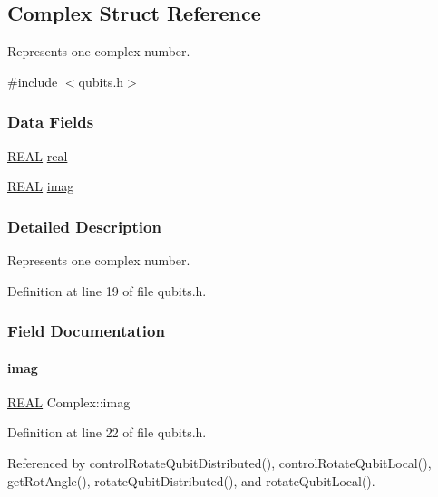 \hypertarget{structComplex}{}\subsection{Complex Struct Reference}
\label{structComplex}


Represents one complex number.  




{\ttfamily \#include $<$qubits.\+h$>$}

\subsubsection*{Data Fields}
\begin{DoxyCompactItemize}
\item 
\hyperlink{precision_8h_a4b654506f18b8bfd61ad2a29a7e38c25}{R\+E\+AL} \hyperlink{structComplex_a479ad939835457595fcca3ca55c06283}{real}
\item 
\hyperlink{precision_8h_a4b654506f18b8bfd61ad2a29a7e38c25}{R\+E\+AL} \hyperlink{structComplex_a1151948284b21c0052f203f23ab931d9}{imag}
\end{DoxyCompactItemize}


\subsubsection{Detailed Description}
Represents one complex number. 

Definition at line 19 of file qubits.\+h.



\subsubsection{Field Documentation}
\mbox{\label{structComplex_a1151948284b21c0052f203f23ab931d9}} 
\paragraph{\texorpdfstring{imag}{imag}}
{\footnotesize\ttfamily \hyperlink{precision_8h_a4b654506f18b8bfd61ad2a29a7e38c25}{R\+E\+AL} Complex\+::imag}



Definition at line 22 of file qubits.\+h.



Referenced by control\+Rotate\+Qubit\+Distributed(), control\+Rotate\+Qubit\+Local(), get\+Rot\+Angle(), rotate\+Qubit\+Distributed(), and rotate\+Qubit\+Local().


